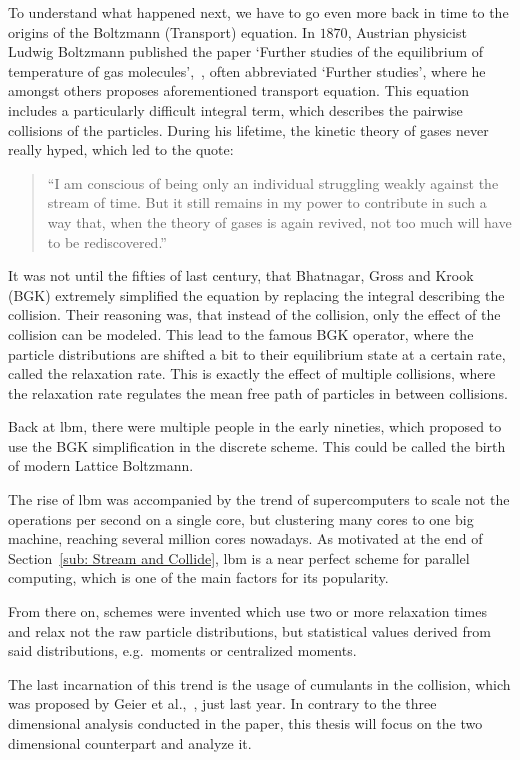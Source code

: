 To understand what happened next, we have to go even more back in time to the origins of the Boltzmann (Transport) equation.
In $1870$, Austrian physicist Ludwig Boltzmann published the paper `Further studies of the equilibrium of temperature of gas molecules',~\cite{Boltzmann1970}, often abbreviated `Further studies', where he amongst others proposes aforementioned transport equation.
This equation includes a particularly difficult integral term, which describes the pairwise collisions of the particles.
During his lifetime, the kinetic theory of gases never really hyped, which led to the quote:
\begin{quotation}
``I am conscious of being only an individual struggling weakly against the stream of time.
But it still remains in my power to contribute in such a way that, when the theory of gases is again revived, not too much will have to be rediscovered.''
\end{quotation}
It was not until the fifties of last century, that Bhatnagar, Gross and Krook (BGK) extremely simplified the equation by replacing the integral describing the collision.
Their reasoning was, that instead of the collision, only the effect of the collision can be modeled.
This lead to the famous BGK operator, where the particle distributions are shifted a bit to their equilibrium state at a certain rate, called the relaxation rate.
This is exactly the effect of multiple collisions, where the relaxation rate regulates the mean free path of particles in between collisions.

Back at \gls{lbm}, there were multiple people in the early nineties, which proposed to use the BGK simplification in the discrete scheme.
This could be called the birth of modern Lattice Boltzmann.

The rise of \gls{lbm} was accompanied by the trend of supercomputers to scale not the operations per second on a single core, but clustering many cores to one big machine, reaching several million cores nowadays.
As motivated at the end of Section~\ref{sub: Stream and Collide}, \gls{lbm} is a near perfect scheme for parallel computing, which is one of the main factors for its popularity.

From there on, schemes were invented which use two or more relaxation times and relax not the raw particle distributions, but statistical values derived from said distributions, e.g.\ moments or centralized moments.

The last incarnation of this trend is the usage of cumulants in the collision, which was proposed by Geier et al.,~\cite{geier2015cumulant}, just last year.
In contrary to the three dimensional analysis conducted in the paper, this thesis will focus on the two dimensional counterpart and analyze it.
